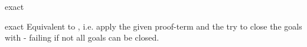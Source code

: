 \begin{tactic}{exact}
  \begin{tsyntax}[empty]{exact}
  Equivalent to , i.e. apply the given
  proof-term and the try to close the goals with  - failing
  if not all goals can be closed.
  \end{tsyntax}
\end{tactic}
